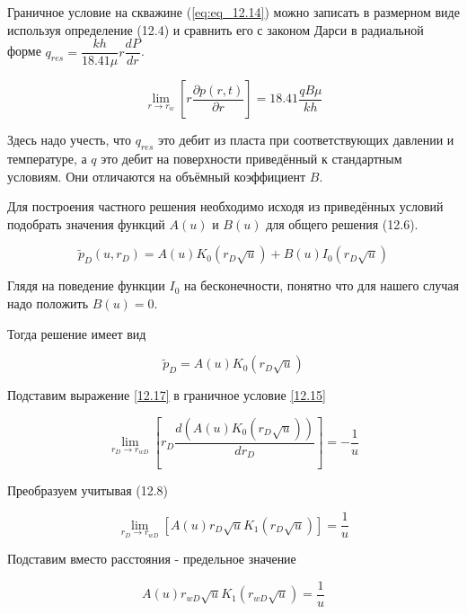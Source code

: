 Граничное условие на скважине (\ref{eq:eq_12.14}) можно записать в размерном виде используя определение (12.4) и сравнить его с законом Дарси в радиальной форме $q_{res} = \dfrac{kh}{18.41 \mu} r \dfrac{dP}{dr}$.

\begin{equation}  \label{eq:eq_12.16}
	\lim_{r \to r_{w}} \left[ r \dfrac{ \partial p(r, t)}{\partial r} \right] = 18.41 \dfrac{qB\mu}{kh} 
\end{equation}

Здесь надо учесть, что $q_{res}$ это дебит из пласта при соответствующих давлении и температуре, а $q$ это дебит на поверхности приведённый к стандартным условиям. Они отличаются на объёмный коэффициент $B$.

Для построения частного решения необходимо исходя из приведённых условий подобрать значения функций $A(u)$ и $B(u)$ для общего решения (12.6). 

\begin{equation}  \label{eq:eq_12.6}
	 \tilde{p}_D(u, r_D) = A(u) K_0(r_D \sqrt u) + B(u) I_0(r_D \sqrt u) 
\end{equation}


Глядя на поведение функции $I_0$ на бесконечности, понятно что для нашего случая надо положить $B(u) = 0 $. 

Тогда решение имеет вид

\begin{equation}  \label{eq:eq_12.17}
	 \tilde{p}_D = A(u) K_0(r_D \sqrt u) 
\end{equation}

Подставим выражение \eqref{12.17} в граничное условие \eqref{12.15}


\begin{equation}  \label{eq:eq_12.18}
	 \lim_{r_D \to r_{wD}} \left[ r_D \dfrac{ d \left( A(u) K_0(r_D \sqrt u)\right)}{d r_D} \right] = -\dfrac{1}{u} 
\end{equation} 

Преобразуем учитывая (12.8)

\begin{equation}  \label{eq:eq_12.19} 
	\lim_{r_D \to r_{wD}} \left[A(u) r_D\sqrt u  K_1(r_D \sqrt u) \right] = \dfrac{1}{u} 
\end{equation}

Подставим вместо расстояния - предельное значение

\begin{equation}  \label{eq:eq_12.20} 
	A(u) r_{wD} \sqrt u  K_1(r_{wD} \sqrt u)  = \dfrac{1}{u}
	\end{equation}

